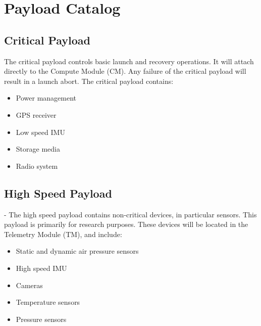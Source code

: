 \documentclass[12pt,article]{memoir}
\begin{document}
\section{Payload Catalog}
\subsection{Critical Payload}
The critical payload controls basic launch and recovery operations. It will attach directly to the Compute Module (CM). Any failure of the critical payload will result in a launch abort. The critical payload contains:
\begin{itemize}
\item Power management
\item GPS receiver
\item Low speed IMU
\item Storage media
\item Radio system
\end{itemize}

\subsection{High Speed Payload} - The high speed payload contains non-critical devices, in particular sensors. This payload is primarily for research purposes. These devices will be located in the Telemetry Module (TM), and include:
\begin{itemize}
\item Static and dynamic air pressure sensors
\item High speed IMU
\item Cameras
\item Temperature sensors
\item Pressure sensors
\end{itemize}
\end{document}
